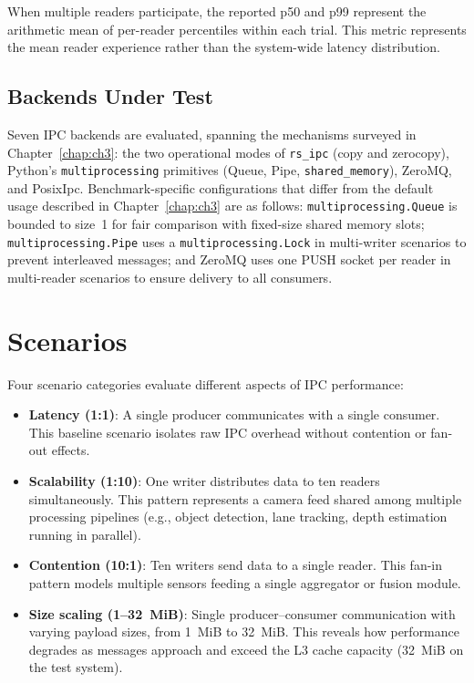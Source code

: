 When multiple readers participate, the reported p50 and p99 represent the arithmetic mean of per-reader percentiles within each trial. This metric represents the mean reader experience rather than the system-wide latency distribution.

\subsection{Backends Under Test}

Seven IPC backends are evaluated, spanning the mechanisms surveyed in Chapter~\ref{chap:ch3}: the two operational modes of \texttt{rs\_ipc} (copy and zerocopy), Python's \texttt{multi\-processing} primitives (Queue, Pipe, \texttt{shared\_memory}), ZeroMQ, and PosixIpc. Benchmark-specific configurations that differ from the default usage described in Chapter~\ref{chap:ch3} are as follows: \texttt{multiprocessing.Queue} is bounded to size~1 for fair comparison with fixed-size shared memory slots; \texttt{multiprocessing.Pipe} uses a \texttt{multi\-processing.Lock} in multi-writer scenarios to prevent interleaved messages; and ZeroMQ uses one PUSH socket per reader in multi-reader scenarios to ensure delivery to all consumers.

\bigskip
\section{Scenarios}
\label{sec:bench_scenarios}

Four scenario categories evaluate different aspects of IPC performance:

\begin{itemize}
    \item \textbf{Latency (1:1)}: A single producer communicates with a single consumer. This baseline scenario isolates raw IPC overhead without contention or fan-out effects.

    \item \textbf{Scalability (1:10)}: One writer distributes data to ten readers simultaneously. This pattern represents a camera feed shared among multiple processing pipelines (e.g., object detection, lane tracking, depth estimation running in parallel).

    \item \textbf{Contention (10:1)}: Ten writers send data to a single reader. This fan-in pattern models multiple sensors feeding a single aggregator or fusion module.

    \item \textbf{Size scaling (1--32~MiB)}: Single producer--consumer communication with varying payload sizes, from 1~MiB to 32~MiB. This reveals how performance degrades as messages approach and exceed the L3 cache capacity (32~MiB on the test system).
\end{itemize}


